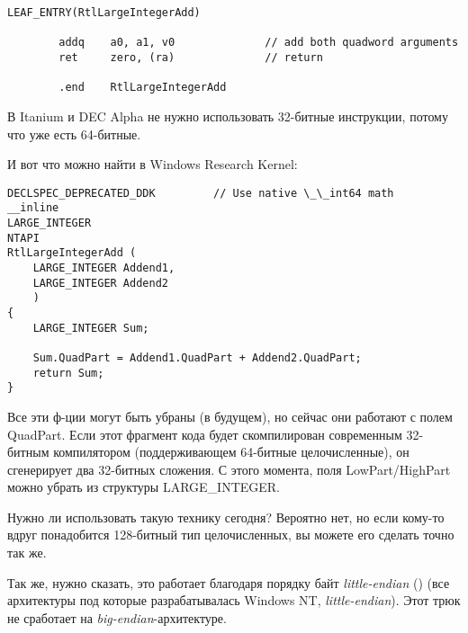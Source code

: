 \begin{lstlisting}[caption=Архитектура DEC Alpha]
        LEAF_ENTRY(RtlLargeIntegerAdd)

        addq    a0, a1, v0              // add both quadword arguments
        ret     zero, (ra)              // return

        .end    RtlLargeIntegerAdd
\end{lstlisting}

В Itanium и DEC Alpha не нужно использовать 32-битные инструкции, потому что уже есть 64-битные.

И вот что можно найти в Windows Research Kernel:

\begin{lstlisting}[style=customc]
DECLSPEC_DEPRECATED_DDK         // Use native \_\_int64 math
__inline
LARGE_INTEGER
NTAPI
RtlLargeIntegerAdd (
    LARGE_INTEGER Addend1,
    LARGE_INTEGER Addend2
    )
{
    LARGE_INTEGER Sum;

    Sum.QuadPart = Addend1.QuadPart + Addend2.QuadPart;
    return Sum;
}
\end{lstlisting}

Все эти ф-ции могут быть убраны (в будущем), но сейчас они работают с полем QuadPart.
Если этот фрагмент кода будет скомпилирован современным 32-битным компилятором (поддерживающем 64-битные целочисленные),
он сгенерирует два 32-битных сложения.
С этого момента, поля LowPart/HighPart можно убрать из структуры  LARGE\_INTEGER.

Нужно ли использовать такую технику сегодня?
Вероятно нет, но если кому-то вдруг понадобится 128-битный тип целочисленных, вы можете его сделать точно так же.

Так же, нужно сказать, это работает благодаря порядку байт \emph{little-endian} ()
(все архитектуры под которые разрабатывалась Windows NT, \emph{little-endian}).
Этот трюк не сработает на \emph{big-endian}-архитектуре.

